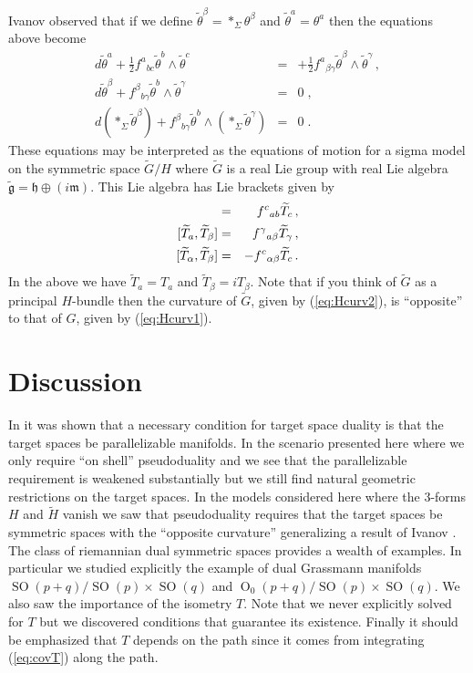 \documentclass[a4paper,12pt]{article}
\DeclareMathOperator{\Orth}{O}
\DeclareMathOperator{\SOrth}{SO}
\newcommand{\hodge}{*_{\Sigma}}
\newcommand{\lieg}{\mathfrak{g}}
\newcommand{\lieh}{\mathfrak{h}}
\newcommand{\liem}{\mathfrak{m}}
\newcommand{\Gtil}{\widetilde{G}}
\newcommand{\Htil}{\widetilde{H}}
\newcommand{\Ttil}{\widetilde{T}}
\newcommand{\half}{\frac{1}{2}}
\newcommand{\thetatil}{\tilde{\theta}}
\begin{document}
Ivanov observed that if we define $\thetatil^{\beta} = 
\hodge\theta^{\beta}$ and $\thetatil^{a}=\theta^{a}$ then the 
equations above become
\begin{eqnarray}
    d\thetatil^{a} + \half f^{a}{}_{bc}\thetatil^{b}\wedge \thetatil^{c}
    & = & + \half f^{a}{}_{\beta\gamma} 
    \thetatil^{\beta}\wedge\thetatil^{\gamma}\,,
    \label{eq:Hcurv2}  \\
    d\thetatil^{\beta} + f^{\beta}{}_{b\gamma} 
    \thetatil^{b}\wedge\thetatil^{\gamma} & = & 0\;, \\
    \label{eq:covm2}
    d(\hodge\thetatil^{\beta}) + f^{\beta}{}_{b\gamma} 
    \thetatil^{b}\wedge (\hodge\thetatil^{\gamma}) & = & 0\;.
    \label{eq:wave2} 
\end{eqnarray}
These equations may be interpreted as the equations of motion for a
sigma model on the symmetric space $\Gtil/H$ where $\Gtil$ is a real
Lie group with real Lie algebra $\tilde{\lieg} = \lieh \oplus
(i\liem)$.  This Lie algebra has Lie brackets given by
\begin{eqnarray}
    [\Ttil_{a},\Ttil_{b}] & = & f^{c}{}_{ab}\Ttil_{c}\,,
    \label{eq:hhhtil}  \\ \relax
    [\Ttil_{a},\Ttil_{\beta}] & = & f^{\gamma}{}_{a\beta}\Ttil_{\gamma}\,,
    \label{eq:hmmtil}  \\ \relax
    [\Ttil_{\alpha},\Ttil_{\beta}] & = & -f^{c}{}_{\alpha\beta}\Ttil_{c}\,.
    \label{eq:mmhtil}
\end{eqnarray}
In the above we have $\Ttil_{a}=T_{a}$ and $\Ttil_{\beta}=
iT_{\beta}$.  Note that if you think of $\Gtil$ as a principal
$H$-bundle then the curvature of $\Gtil$, given by (\ref{eq:Hcurv2}), is
``opposite'' to that of $G$, given by (\ref{eq:Hcurv1}).


\section{Discussion}
\label{sec:discussion}

In \cite{Alvarez:2000bh} it was shown that a necessary condition for
target space duality is that the target spaces be parallelizable
manifolds.  In the scenario presented here where we only require ``on
shell'' pseudoduality and we see that the parallelizable requirement
is weakened substantially but we still find natural geometric
restrictions on the target spaces.  In the models considered here
where the $3$-forms $H$ and $\Htil$ vanish we saw that pseudoduality
requires that the target spaces be symmetric spaces with the
``opposite curvature'' generalizing a result of Ivanov
\cite{Ivanov:1987yv}.  The class of riemannian dual symmetric spaces
provides a wealth of examples.  In particular we studied explicitly
the example of dual Grassmann manifolds
$\SOrth(p+q)/\SOrth(p)\times\SOrth(q)$ and
$\Orth_{0}(p+q)/\SOrth(p)\times\SOrth(q)$.  We also saw the importance
of the isometry $T$.  Note that we never explicitly solved for $T$ but
we discovered conditions that guarantee its existence.  Finally it
should be emphasized that $T$ depends on the path since it comes from
integrating (\ref{eq:covT}) along the path.
\end{document}
